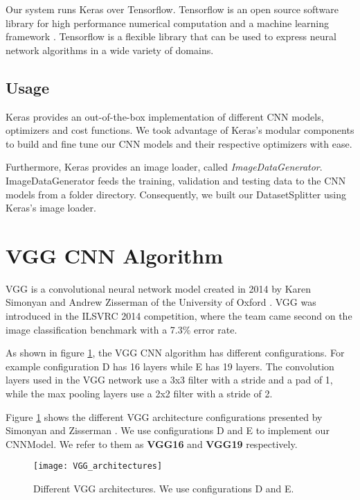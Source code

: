 Our system runs Keras over Tensorflow. Tensorflow is an open source software library for high performance numerical computation and a machine learning framework \cite{tensorflow2015-whitepaper}. Tensorflow is a flexible library that can be used to express neural network algorithms in a wide variety of domains.

\subsection{Usage}
Keras provides an out-of-the-box implementation of different CNN models, optimizers and cost functions. We took advantage of Keras's modular components to build and fine tune our CNN models and their respective optimizers with ease.

Furthermore, Keras provides an image loader, called \textit{ImageDataGenerator}. ImageDataGenerator feeds the training, validation and testing data to the CNN models from a folder directory. Consequently, we built our DatasetSplitter using Keras's image loader.


\section{VGG CNN Algorithm}\label{sec:vgg_algorithm}
VGG is a convolutional neural network model created in 2014 by Karen Simonyan and Andrew Zisserman of the University of Oxford \cite{simonyan2014very}. VGG was introduced in the ILSVRC 2014 competition, where the team came second on the image classification benchmark with a 7.3\% error rate.

As shown in figure \ref{fig:VGG_architectures}, the VGG CNN algorithm has different configurations. For example configuration D has 16 layers while E has 19 layers. The convolution layers used in the VGG network use a 3x3 filter with a stride and a pad of 1, while the max pooling layers use a 2x2 filter with a stride of 2.

Figure \ref{fig:VGG_architectures} shows the different VGG architecture configurations presented by Simonyan and Zisserman \cite{simonyan2014very}. We use configurations D and E to implement our CNNModel. We refer to them as \textbf{VGG16} and \textbf{VGG19} respectively.

\begin{figure}[H]
\centering
  \texttt{[image: VGG\_architectures]}
\caption{Different VGG architectures. We use configurations D and E.}
\label{fig:VGG_architectures}
\end{figure}


